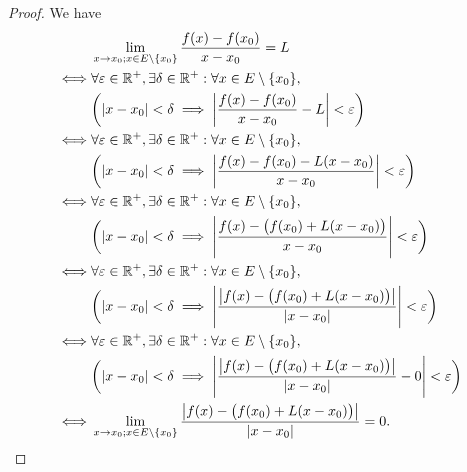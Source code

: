 \begin{proof}
  We have
  \begin{align*}
         & \lim_{x \to x_0 ; x \in E \setminus \set{x_0}} \dfrac{f(x) - f(x_0)}{x - x_0} = L                                                     \\
    \iff & \forall \varepsilon \in \R^+, \exists \delta \in \R^+ : \forall x \in E \setminus \set{x_0},                                          \\
         & \bigg(\abs{x - x_0} < \delta \implies \abs{\dfrac{f(x) - f(x_0)}{x - x_0} - L} < \varepsilon\bigg)                                    \\
    \iff & \forall \varepsilon \in \R^+, \exists \delta \in \R^+ : \forall x \in E \setminus \set{x_0},                                          \\
         & \bigg(\abs{x - x_0} < \delta \implies \abs{\dfrac{f(x) - f(x_0) - L(x - x_0)}{x - x_0}} < \varepsilon\bigg)                           \\
    \iff & \forall \varepsilon \in \R^+, \exists \delta \in \R^+ : \forall x \in E \setminus \set{x_0},                                          \\
         & \bigg(\abs{x - x_0} < \delta \implies \abs{\dfrac{f(x) - \big(f(x_0) + L(x - x_0)\big)}{x - x_0}} < \varepsilon\bigg)                 \\
    \iff & \forall \varepsilon \in \R^+, \exists \delta \in \R^+ : \forall x \in E \setminus \set{x_0},                                          \\
         & \bigg(\abs{x - x_0} < \delta \implies \abs{\dfrac{\abs{f(x) - \big(f(x_0) + L(x - x_0)\big)}}{\abs{x - x_0}}} < \varepsilon\bigg)     \\
    \iff & \forall \varepsilon \in \R^+, \exists \delta \in \R^+ : \forall x \in E \setminus \set{x_0},                                          \\
         & \bigg(\abs{x - x_0} < \delta \implies \abs{\dfrac{\abs{f(x) - \big(f(x_0) + L(x - x_0)\big)}}{\abs{x - x_0}} - 0} < \varepsilon\bigg) \\
    \iff & \lim_{x \to x_0 ; x \in E \setminus \set{x_0}} \dfrac{\abs{f(x) - \big(f(x_0) + L(x - x_0)\big)}}{\abs{x - x_0}} = 0.
  \end{align*}
\end{proof}

